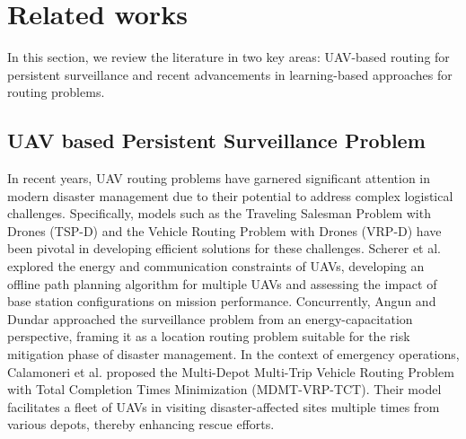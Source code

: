 \section{Related works}
\label{sec2}
In this section, we review the literature in two key areas: UAV-based routing for persistent surveillance and recent advancements in learning-based approaches for routing problems.

\subsection{UAV based Persistent Surveillance Problem}
In recent years, UAV routing problems have garnered significant attention in modern disaster management due to their potential to address complex logistical challenges. Specifically, models such as the Traveling Salesman Problem with Drones (TSP-D) and the Vehicle Routing Problem with Drones (VRP-D) have been pivotal in developing efficient solutions for these challenges. Scherer et al. \cite{scherer2016persistent} explored the energy and communication constraints of UAVs, developing an offline path planning algorithm for multiple UAVs and assessing the impact of base station configurations on mission performance. Concurrently, Angun and Dundar \cite{angun2020intelligent} approached the surveillance problem from an energy-capacitation perspective, framing it as a location routing problem suitable for the risk mitigation phase of disaster management. In the context of emergency operations, Calamoneri et al. \cite{calamoneri2024management} proposed the Multi-Depot Multi-Trip Vehicle Routing Problem with Total Completion Times Minimization (MDMT-VRP-TCT). Their model facilitates a fleet of UAVs in visiting disaster-affected sites multiple times from various depots, thereby enhancing rescue efforts.
